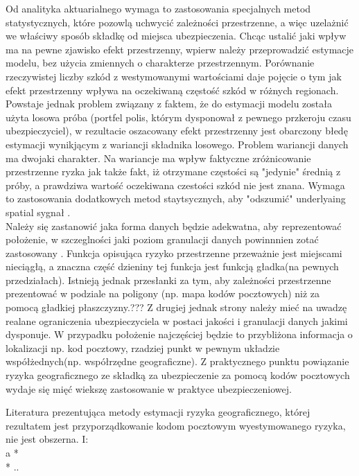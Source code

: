 \documentclass[polish, twoside, 12pt, a4paper]{article}
\theoremstyle{definition}
\theoremstyle{plain}
\theoremstyle{remark}
\begin{document}
Od analityka aktuarialnego wymaga to zastosowania specjalnych metod statystycznych, które pozowlą uchwycić zależności przestrzenne, a więc uzelażnić we właściwy sposób składkę od miejsca ubezpieczenia. Chcąc ustalić jaki wpływ ma na pewne zjawisko efekt przestrzenny, wpierw należy przeprowadzić estymacje modelu, bez użycia zmiennych o charakterze przestrzennym. Porównanie rzeczywistej liczby szkód z westymowanymi wartościami daje pojęcie o tym jak efekt przestrzenny wpływa na oczekiwaną częstość szkód w różnych regionach.  Powstaje jednak problem związany z faktem, że do estymacji modelu została użyta losowa próba (portfel polis, którym dysponował z pewnego przkeroju czasu ubezpieczyciel), w rezultacie oszacowany efekt przestrzenny jest obarczony błedę estymacji wynikjącym z wariancji składnika losowego. Problem wariancji danych ma dwojaki charakter. Na wariancje ma wpływ faktyczne zróżnicowanie przestrzenne ryzka jak także fakt, iż otrzymane częstości są "jedynie" średnią z próby, a prawdziwa wartość oczekiwana czestości szkód nie jest znana. Wymaga to zastosowania dodatkowych metod staytsycznych, aby "odszumić" underlyaing spatial sygnał .
\\




Należy się zastanowić jaka forma danych będzie adekwatna, aby reprezentować położenie, w szczeglności jaki poziom granulacji danych powinnnien zotać zastosowany . Funkcja opisująca ryzyko przestrzenne przeważnie jest miejscami nieciągłą, a znaczna część dzieniny tej funkcja jest funkcją gładka(na pewnych przedziałach). Istnieją jednak przesłanki za tym, aby zależności przestrzenne prezentować w podziale na poligony (np. mapa kodów pocztowych) niż za pomocą  gładkiej płaszczyzny.???
Z drugiej jednak strony należy mieć na uwadzę realane ograniczenia ubezpieczyciela w postaci  jakości i granulacji danych jakimi dysponuje. W przypadku położenie najczęściej będzie to przybliżona informacja o lokalizacji np. kod pocztowy, rzadziej punkt w pewnym układzie współżednych(np. współrzędne geograficzne). Z praktycznego punktu powiązanie ryzyka geograficznego ze składką za ubezpieczenie za pomocą kodów pocztowych wydaje się mięć wiekszę zastosowanie w praktyce ubezpieczeniowej.


 Literatura prezentująca metody estymacji ryzyka geograficznego, której rezultatem jest przyporządkowanie kodom pocztowym wyestymowanego ryzyka, nie jest obszerna. I:\\a
*\\
* ..\\
\end{document}
